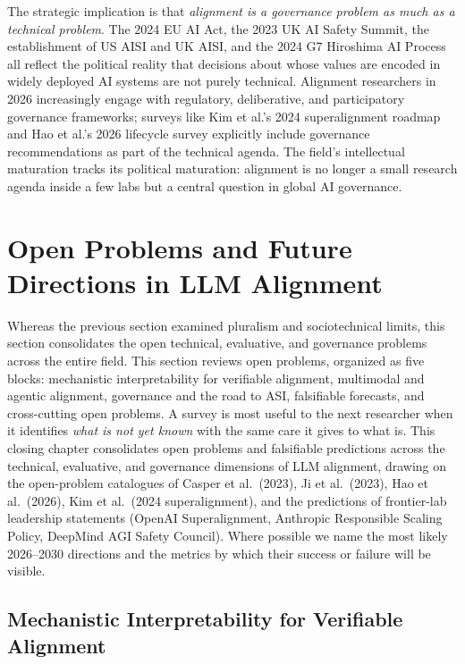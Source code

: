\documentclass{article}
\begin{document}
The strategic implication is that \emph{alignment is a governance problem as much as a technical problem}. The 2024 EU AI Act, the 2023 UK AI Safety Summit, the establishment of US AISI and UK AISI, and the 2024 G7 Hiroshima AI Process all reflect the political reality that decisions about whose values are encoded in widely deployed AI systems are not purely technical. Alignment researchers in 2026 increasingly engage with regulatory, deliberative, and participatory governance frameworks; surveys like Kim et al.'s 2024 superalignment roadmap and Hao et al.'s 2026 lifecycle survey explicitly include governance recommendations as part of the technical agenda. The field's intellectual maturation tracks its political maturation: alignment is no longer a small research agenda inside a few labs but a central question in global AI governance.

\section{Open Problems and Future Directions in LLM Alignment}\label{open-problems-and-future-directions-in-llm-alignment}

Whereas the previous section examined pluralism and sociotechnical limits, this section consolidates the open technical, evaluative, and governance problems across the entire field. This section reviews open problems, organized as five blocks: mechanistic interpretability for verifiable alignment, multimodal and agentic alignment, governance and the road to ASI, falsifiable forecasts, and cross-cutting open problems. A survey is most useful to the next researcher when it identifies \emph{what is not yet known} with the same care it gives to what is. This closing chapter consolidates open problems and falsifiable predictions across the technical, evaluative, and governance dimensions of LLM alignment, drawing on the open-problem catalogues of Casper et al.~(2023), Ji et al.~(2023), Hao et al.~(2026), Kim et al.~(2024 superalignment), and the predictions of frontier-lab leadership statements (OpenAI Superalignment, Anthropic Responsible Scaling Policy, DeepMind AGI Safety Council). Where possible we name the most likely 2026--2030 directions and the metrics by which their success or failure will be visible.

\subsection{Mechanistic Interpretability for Verifiable Alignment}\label{mechanistic-interpretability-for-verifiable-alignment}
\end{document}
